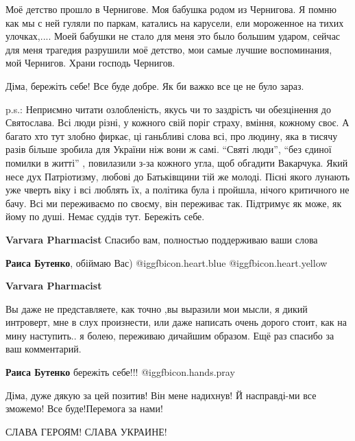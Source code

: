\begin{itemize}

Моё детство прошло в Чернигове. Моя бабушка родом из Чернигова. Я помню как мы
с ней гуляли по паркам, катались на карусели, ели мороженное на тихих
улочках,.... Моей бабушки не стало для меня это было большим ударом, сейчас для
меня трагедия разрушили моё детство, мои самые лучшие воспоминания, мой
Чернигов. Храни господь Чернигов.


Діма, бережіть себе! Все буде добре. Як би важко все це не було зараз.

p.s.: Неприємно читати озлобленість, якусь чи то заздрість чи обезцінення до
Святослава. Всі люди різні, у кожного свій поріг страху, вміння, кожному своє.
А багато хто тут злобно фиркає, ці ганьбливі слова всі, про людину, яка в
тисячу разів більше зробила для України ніж вони ж самі. \enquote{Святі люди}, \enquote{без
єдиної помилки в житті} , повилазили з-за кожного угла, щоб обгадити Вакарчука.
Який несе дух Патріотизму, любові до Батьківщини тій же молоді. Пісні якого
лунають уже чверть віку і всі люблять їх, а політика була і пройшла, нічого
критичного не бачу. Всі ми переживаємо по своєму, він переживає так. Підтримує
як може, як йому по душі. Немає суддів тут. Бережіть себе.

\begin{itemize} %
\textbf{Varvara Pharmacist} Спасибо вам, полностью поддерживаю ваши слова

\textbf{Раиса Бутенко}, обіймаю Вас)  @igg{fbicon.heart.blue}  @igg{fbicon.heart.yellow} 

\textbf{Varvara Pharmacist} 

Вы даже не представляете, как точно ,вы выразили мои мысли, я дикий
интроверт, мне в слух произнести, или даже написать очень дорого стоит, как на
мину наступить.. я болею, переживаю дичайшим образом. Ещё раз спасибо за ваш
комментарий.

\textbf{Раиса Бутенко} бережіть себе!!!  @igg{fbicon.hands.pray} 
\end{itemize} %


Діма, дуже дякую за цей позитив! Він мене надихнув! Й насправді-ми все зможемо!
Все буде!Перемога за нами!

СЛАВА ГЕРОЯМ! СЛАВА УКРАИНЕ!



\end{itemize}
